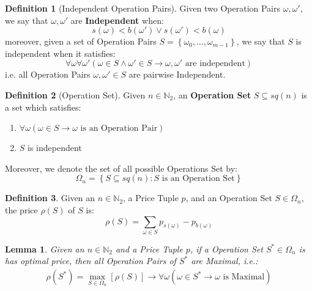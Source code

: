 \documentclass{article}
\newcommand{\N}{\mathbb{N}}
\newcommand{\Nb}[1]{\ensuremath{\N_{#1}}}
\newcommand{\Nt}{\Nb{2}}
\newcommand{\Square}[1]{\ensuremath{sq({#1})}}
\newcommand{\Set}[1]{\ensuremath{\left\{ #1 \right\}}}
\newcommand{\SetOf}[2]{\ensuremath{\Set{ #1 : #2}}}
\newcommand{\op}{\ensuremath{\omega}}
\renewcommand{\b}[1]{\ensuremath{b\left( #1 \right)}}
\newcommand{\s}[1]{\ensuremath{s\left( #1 \right)}}
\newcommand{\price}[1]{\ensuremath{\rho\left( #1 \right)}}
\newcommand{\OS}{\ensuremath{\Omega_{n}}}
\newcommand{\sopt}{\ensuremath{S^{*}}}
\theoremstyle{definition}
\newtheorem{defn}{Definition}
\theoremstyle{plain}
\newtheorem{lemma}{Lemma}
\begin{document}
\begin{defn}[Independent Operation Pairs]
    Given two Operation Pairs $\op, \op'$, we say that $\op, \op'$ are \textbf{Independent} when:
    \begin{equation}
        \s{\op} < \b{\op'} \lor \s{\op'} < \b{\op}
    \end{equation}
    moreover, given a set of Operation Pairs $S = \Set{\op_0, \dots, \op_{m-1}}$, we say that $S$ is independent when it satisfies:
    \begin{equation}
        \forall \op \forall \op' \left(
            \op \in S \land \op' \in S
            \rightarrow
            \op, \op' \mbox{ are independent}
        \right)
    \end{equation}
    i.e. all Operation Pairs $\op, \op' \in S$ are pairwise Independent.
\end{defn}

\begin{defn}[Operation Set]
    Given $n \in \Nt$, an \textbf{Operation Set} $S \subseteq \Square{n}$ is a set which satisfies:
    \begin{enumerate}
        \item $\forall \omega \left( \omega \in S \rightarrow \omega \mbox{ is an Operation Pair} \right)$
        \item $S$ is independent
    \end{enumerate}
    Moreover, we denote the set of all possible Operations Set by:
    \begin{equation}
        \OS = \SetOf{S \subseteq \Square{n}}{S \mbox{ is an Operation Set}}
    \end{equation}
\end{defn}

\begin{defn}
    Given an $n \in \Nt$, a Price Tuple $p$, and an Operation Set $S \in \OS$, the price $\price{S}$ of $S$ is:
    \begin{equation}
        \price{S} = \displaystyle\sum\limits_{\op \in S} p_{\s{\op}} - p_{\b{\op}}
    \end{equation}
\end{defn}

\begin{lemma}
    \label{lemma:opt-price-I}
    Given an $n \in \Nt$ and a Price Tuple $p$, if a Operation Set $\sopt \in \OS$ is has optimal price, then all Operation Pairs of $\sopt$ are Maximal, i.e.:
    \begin{align}
        \price{\sopt} = \max\limits_{S \in \OS} \left[ \price{S} \right]
        \rightarrow
        \forall \op \left( \op \in \sopt \rightarrow \op \mbox{ is Maximal} \right)
    \end{align}
\end{lemma}
\end{document}
